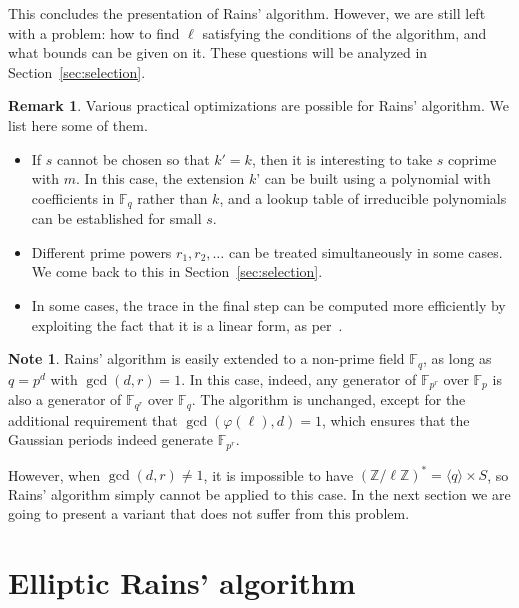 \documentclass[12pt]{article}
\theoremstyle{plain}
\theoremstyle{definition}
\newtheorem*{remark}{Remark}
\newtheorem{note}[theorem]{Note}
\def\Z{\ensuremath{\mathbb{Z}}}
\def\F{\ensuremath{\mathbb{F}}}
\def\euler{\ensuremath{\varphi}}
\newcounter{algorithm}
\begin{document}
This concludes the presentation of Rains' algorithm. However, we are
still left with a problem: how to find $\ell$ satisfying the
conditions of the algorithm, and what bounds can be given on it. These
questions will be analyzed in Section~\ref{sec:selection}.

\begin{remark}
  Various practical optimizations are possible for Rains'
  algorithm. We list here some of them.
  \begin{itemize}
  \item If $s$ cannot be chosen so that $k'=k$, then it is interesting
    to take $s$ coprime with $m$. In this case, the extension $k$' can
    be built using a polynomial with coefficients in $\F_q$ rather
    than $k$, and a lookup table of irreducible polynomials can be
    established for small $s$.
  \item Different prime powers $r_1,r_2,\dots$ can be treated
    simultaneously in some cases. We come back to this in
    Section~\ref{sec:selection}.
  \item In some cases, the trace in the final step can be computed
    more efficiently by exploiting the fact that it is a linear form,
    as per~\cite{todo}.
  \end{itemize}
\end{remark}

\begin{note}
  \label{note:rains-non-prime}
  Rains' algorithm is easily extended to a non-prime field $\F_q$, as
  long as $q=p^d$ with $\gcd(d,r)=1$. In this case, indeed, any
  generator of $\F_{p^r}$ over $\F_p$ is also a generator of
  $\F_{q^r}$ over $\F_q$. The algorithm is unchanged, except for the
  additional requirement that $\gcd(\euler(\ell),d)=1$, which ensures
  that the Gaussian periods indeed generate $\F_{p^r}$.

  However, when $\gcd(d,r)\ne 1$, it is impossible to have
  $(\Z/\ell\Z)^\ast=\langle q\rangle\times S$, so Rains' algorithm
  simply cannot be applied to this case. In the next section we are
  going to present a variant that does not suffer from this problem.
\end{note}



\section{Elliptic Rains' algorithm}
\label{sec:rains-elliptic}
\end{document}

